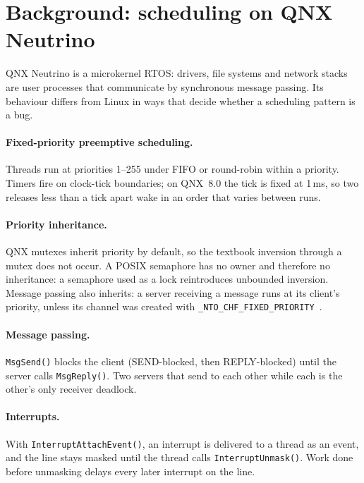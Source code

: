 \documentclass[sigconf,review]{acmart}
\newcommand{\qnx}[1]{\texttt{#1}}
\begin{document}
\section{Background: scheduling on QNX Neutrino}
\label{sec:background}

QNX Neutrino is a microkernel RTOS: drivers, file systems and network stacks are user processes that communicate by
synchronous message passing. Its behaviour differs from Linux in ways that decide whether a scheduling pattern is a bug.

\paragraph{Fixed-priority preemptive scheduling.} Threads run at priorities 1--255 under FIFO or round-robin within a priority.
Timers fire on clock-tick boundaries; on QNX~8.0 the tick is fixed at 1\,ms, so two releases less than a tick apart wake in an
order that varies between runs.

\paragraph{Priority inheritance.} QNX mutexes inherit priority by default, so the textbook inversion through a mutex does not
occur. A POSIX semaphore has no owner and therefore no inheritance: a semaphore used as a lock reintroduces unbounded inversion.
Message passing also inherits: a server receiving a message runs at its client's priority, unless its channel was created with
\qnx{\_NTO\_CHF\_FIXED\_PRIORITY}~\cite{qnx-sysarch}.

\paragraph{Message passing.} \qnx{MsgSend()} blocks the client (SEND-blocked, then REPLY-blocked) until the server calls
\qnx{MsgReply()}. Two servers that send to each other while each is the other's only receiver deadlock.

\paragraph{Interrupts.} With \qnx{InterruptAttachEvent()}, an interrupt is delivered to a thread as an event, and the line stays
masked until the thread calls \qnx{InterruptUnmask()}. Work done before unmasking delays every later interrupt on the line.
\end{document}
